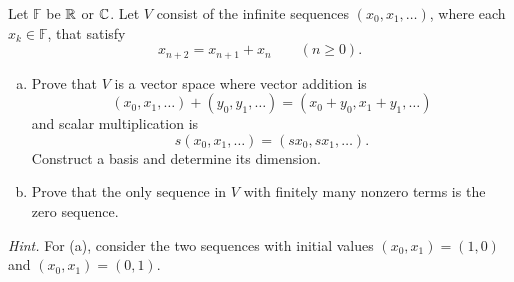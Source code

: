 \begin{exercise}
  \label{ex:hw01:recursive-sequences}
  Let \(\mathbb F\) be \(\mathbb{R}\) or \(\mathbb{C}\). Let \(V\) consist of the
  infinite sequences \((x_0,x_1,\ldots)\), where each \(x_k\in\mathbb F\),
  that satisfy
  \[
    x_{n+2}=x_{n+1}+x_n\qquad(n\ge0).
  \]
  \begin{enumerate}[(a)][2]
    \item Prove that \(V\) is a vector space where vector addition is
      \[
        (x_0,x_1,\ldots)+(y_0,y_1,\ldots)
          =(x_0+y_0,x_1+y_1,\ldots)
      \]
      and scalar multiplication is
      \[
        s(x_0,x_1,\ldots)=(sx_0,sx_1,\ldots).
      \]
      Construct a basis and determine its dimension.
    \item Prove that the only sequence in \(V\) with finitely many nonzero
      terms is the zero sequence.
  \end{enumerate}
  \emph{Hint.} For (a), consider the two sequences with initial values
  \((x_0,x_1)=(1,0)\) and \((x_0,x_1)=(0,1)\).
\end{exercise}
